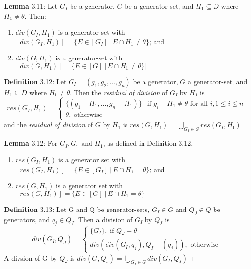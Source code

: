 \documentclass{article}
\begin{document}
\par 
\textbf{Lemma} 3.11: Let $G_I$ be a generator, $G$ be a generator-set, and $H_1
\subseteq D$ where $H_1 \neq \theta$. Then:
\begin{enumerate}[label={(\alph*)}]
  \item $div(G_I, H_1)$ is a generator-set with $[div(G_I, H_1)] = \{ E \in
  [G_I] \:|\: E \cap H_1 \neq \theta \}$; and
  \item $div(G, H_1)$ is a generator-set with $[div(G, H_1)] = \{ E \in [G]
  \:|\: E \cap H_1 \neq \theta \}]$\newline
\end{enumerate}

\par 
\textbf{Definition} 3.12: Let $G_I = (g_1, g_2, \ldots, g_n)$ be a generator,
$G$ a generator-set, and $H_1 \subseteq D$ where $H_1 \neq \theta$. Then the
\textit{residual of division} of $G_I$ by $H_1$ is 
\[
res(G_I, H_1) =
\begin{cases}
   \{ (g_1 - H_1, \ldots, g_n - H_1) \}, \text{ if } g_i - H_1 \neq \theta
   \text{ for all } i, 1 \leq i \leq n
   \\
   \theta, \text{ otherwise}
\end{cases}
\] 
and the \textit{residual of division} of $G$ by $H_1$ is \newline
$res(G, H_1) = \bigcup\limits_{G_I \in G} res(G_I, H_1)$
\newline

\par 
\textbf{Lemma} 3.12: For $G_I, G, \text{ and } H_1$, as defined in Definition
3.12, 
\begin{enumerate}[label={(\alph*)}]
  \item $res(G_I, H_1)$ is a generator set with $[res(G_I, H_1)] = \{ E \in
  [G_I] \:|\: E \cap H_1 = \theta \}$; and
  \item $res(G, H_1)$ is a generator set with $[res(G, H_1)] = \{ E \in [G]
  \:|\: E \cap H_1 = \theta \}$\newline
\end{enumerate}

\par 
\textbf{Definition} 3.13: Let G and Q be generator-sets, $G_I \in G$ and $Q_J
\in Q$ be generators, and $q_j \in Q_J$. Then a division of $G_I$ by $Q_J$ is
\[
   div( G_I, Q_J) = 
   \begin{cases}
   \{G_I\}, \text{ if } Q_J = \theta \\
   div( div( G_I, q_j), Q_I - (q_j)), \text{ otherwise}
   \end{cases}
\]
A divsion of G by $Q_J$ is $div(G, Q_J) = \bigcup\limits_{G_I \in G} div( G_I,
Q_J)$ \newline+
\end{document}
